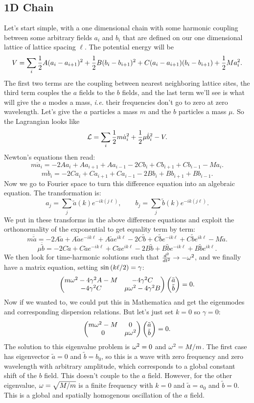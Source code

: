 \documentclass[12pt]{article}
\begin{document}
\subsection{1D Chain}
Let's start simple, with a one dimensional chain with some harmonic coupling between some arbitrary fields $a_i$ and $b_i$ that are defined on our one dimensional lattice of lattice spacing $\ell$. The potential energy will be
\[ V = \sum_i \frac{1}{2}A (a_i-a_{i+1})^2 + \frac{1}{2} B(b_i - b_{i+1})^2 + C(a_i-a_{i+1})(b_i - b_{i+1}) + \frac{1}{2} M a_i^2.\]
The first two terms are the coupling between nearest neighboring lattice sites, the third term couples the $a$ fields to the $b$ fields, and the last term we'll see is what will give the $a$ modes a mass, \emph{i.e.} their frequencies don't go to zero at zero wavelength. Let's give the $a$ particles a mass $m$ and the $b$ particles a mass $\mu$. So the Lagrangian looks like
\[ \mathcal{L} = \sum_i \frac{1}{2}m \dot{a}_i^2 + \frac{1}{2}\mu \dot{b}_i^2 - V.\]
Newton's equations then read:
\[ m\ddot{a}_i = -2Aa_i + Aa_{i+1} +Aa_{i-1} - 2Cb_i +Cb_{i+1} + Cb_{i-1} - Ma_i.\]
\[ m\ddot{b}_i = -2Ca_i + Ca_{i+1} +Ca_{i-1} - 2Bb_i +Bb_{i+1} + Bb_{i-1}.\]
Now we go to Fourier space to turn this difference equation into an algebraic equation. The transformation is:
\[ a_j = \sum_j \tilde{a}(k) e^{-i k(j\ell)},\qquad b_j = \sum_j \tilde{b}(k) e^{-ik(j\ell)}.\]
We put in these transforms in the above difference equations and exploit the orthonormality of the exponential to get equality term by term:
\[ m\ddot{\tilde{a}} = -2A\tilde{a} + A\tilde{a}e^{-ik\ell} + A\tilde{a}e^{ik\ell} - 2C \tilde{b} + C \tilde b e^{-ik\ell} + C\tilde b e^{i k \ell} - M\tilde a.\]
\[ \mu\ddot{\tilde{b}} = -2C\tilde{a} + C\tilde{a}e^{-ik\ell} + C\tilde{a}e^{ik\ell} - 2B \tilde{b} + B \tilde b e^{-ik\ell} + B\tilde b e^{i k \ell}.\]
We then look for time-harmonic solutions such that $\frac{d {^2}}{d {t^2}}\rightarrow -\omega^2$, and we finally have a matrix equation, setting $\sin{\left(k\ell/2\right)} = \gamma$:
\[ \left(\begin{matrix}m\omega^2 - 4\gamma^2 A - M & -4\gamma^2 C \\ - 4\gamma^2 C & \mu \omega^2 - 4\gamma^2 B\end{matrix}\right) \left(\begin{matrix}\tilde a \\ \tilde b\end{matrix}\right) = 0.\]
Now if we wanted to, we could put this in Mathematica and get the eigenmodes and corresponding dispersion relations. But let's just set $k=0$ so $\gamma = 0$:
\[ \left(\begin{matrix}m\omega^2 - M & 0 \\ 0 & \mu \omega^2\end{matrix}\right)\left(\begin{matrix}\tilde a \\ \tilde b\end{matrix}\right) = 0.\]
The solution to this eigenvalue problem is $\omega^2 = 0$ and $\omega^2 = M/m$. The first case has eigenvector $\tilde a = 0$ and $\tilde b = b_0$, so this is a wave with zero frequency and zero wavelength with arbitrary amplitude, which corresponds to a global constant shift of the $b$ field. This doesn't couple to the $a$ field. However, for the other eigenvalue, $\omega = \sqrt{M/m}$ is a finite frequency with $k=0$ and $\tilde a = a_0$ and $\tilde b = 0$. This is a global and spatially homogenous oscillation of the $a$ field.
\end{document}
